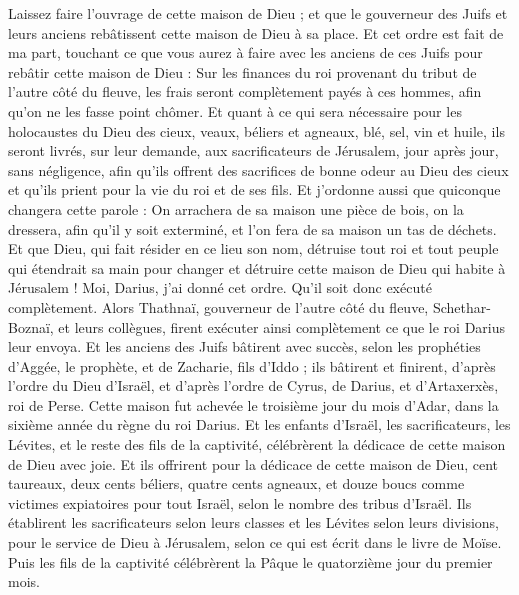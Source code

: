 \begin{multicols}{2}
Laissez faire l'ouvrage de cette maison de Dieu ; et que le gouverneur des Juifs et leurs anciens rebâtissent cette maison de Dieu à sa place.
Et cet ordre est fait de ma part, touchant ce que vous aurez à faire avec les anciens de ces Juifs pour rebâtir cette maison de Dieu : Sur les finances du roi provenant du tribut de l'autre côté du fleuve, les frais seront complètement payés à ces hommes, afin qu'on ne les fasse point chômer.
Et quant à ce qui sera nécessaire pour les holocaustes du Dieu des cieux, veaux, béliers et agneaux, blé, sel, vin et huile, ils seront livrés, sur leur demande, aux sacrificateurs de Jérusalem, jour après jour, sans négligence,
afin qu'ils offrent des sacrifices de bonne odeur au Dieu des cieux et qu'ils prient pour la vie du roi et de ses fils.
Et j'ordonne aussi que quiconque changera cette parole : On arrachera de sa maison une pièce de bois, on la dressera, afin qu'il y soit exterminé, et l'on fera de sa maison un tas de déchets.
Et que Dieu, qui fait résider en ce lieu son nom, détruise tout roi et tout peuple qui étendrait sa main pour changer et détruire cette maison de Dieu qui habite à Jérusalem ! Moi, Darius, j'ai donné cet ordre. Qu'il soit donc exécuté complètement.
Alors Thathnaï, gouverneur de l'autre côté du fleuve, Schethar-Boznaï, et leurs collègues, firent exécuter ainsi complètement ce que le roi Darius leur envoya.
Et les anciens des Juifs bâtirent avec succès, selon les prophéties d'Aggée, le prophète, et de Zacharie, fils d'Iddo ; ils bâtirent et finirent, d'après l'ordre du Dieu d'Israël, et d'après l'ordre de Cyrus, de Darius, et d'Artaxerxès, roi de Perse.
Cette maison fut achevée le troisième jour du mois d'Adar, dans la sixième année du règne du roi Darius.
Et les enfants d'Israël, les sacrificateurs, les Lévites, et le reste des fils de la captivité, célébrèrent la dédicace de cette maison de Dieu avec joie.
Et ils offrirent pour la dédicace de cette maison de Dieu, cent taureaux, deux cents béliers, quatre cents agneaux, et douze boucs comme victimes expiatoires pour tout Israël, selon le nombre des tribus d'Israël.
Ils établirent les sacrificateurs selon leurs classes et les Lévites selon leurs divisions, pour le service de Dieu à Jérusalem, selon ce qui est écrit dans le livre de Moïse.
Puis les fils de la captivité célébrèrent la Pâque le quatorzième jour du premier mois.

\end{multicols}
